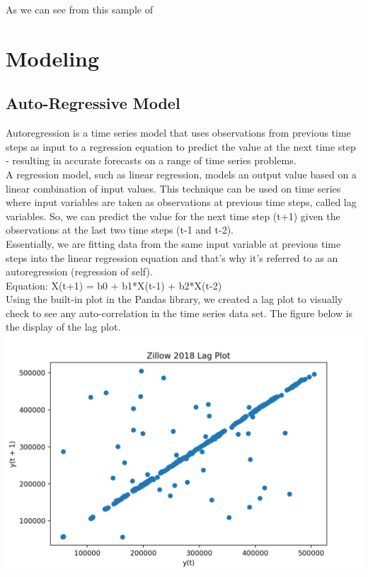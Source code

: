 \documentclass{article}
\begin{document}
	As we can see from this sample of 
	
	\section{Modeling}
	\subsection{Auto-Regressive Model}
	Autoregression is a time series model that uses observations from previous time steps as input to a regression equation to predict the value at the next time step - resulting in accurate forecasts on a range of time series problems. \\
	
	A regression model, such as linear regression, models an output value based on a linear combination of input values. This technique can be used on time series where input variables are taken as observations at previous time steps, called lag variables. So, we can predict the value for the next time step (t+1) given the observations at the last two time steps (t-1 and t-2). \\
	
	Essentially, we are fitting data from the same input variable at previous time steps into the linear regression equation and that's why it's referred to as an autoregression (regression of self). \\
	
	Equation: X(t+1) = b0 + b1*X(t-1) + b2*X(t-2)\\
	
	Using the built-in plot in the Pandas library, we created a lag plot to visually check to see any auto-correlation in the time series data set. The figure below is the display of the lag plot. \\
	
	\includegraphics[scale = 0.5]{../plots/2018/zillow2018_lag.png} \\
	
\end{document}
